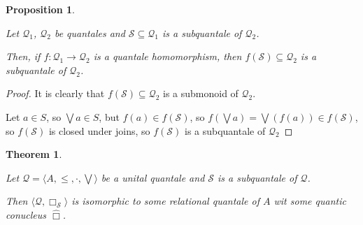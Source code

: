 \documentclass[a4paper]{article}
\theoremstyle{defin}
\theoremstyle{theorem}
\newtheorem{theorem}{Theorem}
\theoremstyle{prop}
\newtheorem{prop}{Proposition}
\theoremstyle{lemma}
\theoremstyle{ex}
\theoremstyle{col}
\begin{document}
\begin{prop}
  $ $

Let $\mathcal{Q}_1$, $\mathcal{Q}_2$ be quantales and
$\mathcal{S} \subseteq \mathcal{Q}_1$ is a subquantale of $\mathcal{Q}_2$.

Then, if $f : \mathcal{Q}_1 \to \mathcal{Q}_2$ is a quantale homomorphism, then $f(\mathcal{S}) \subseteq \mathcal{Q}_2$ is a subquantale of $\mathcal{Q}_2$.
\end{prop}

\begin{proof}
  It is clearly that $f(\mathcal{S}) \subseteq \mathcal{Q}_2$ is a submonoid of $\mathcal{Q}_2$.

  Let $a \in S$, so $\bigvee a \in S$, but $f(a) \in f(\mathcal{S})$, so $f(\bigvee a) = \bigvee (f (a)) \in f(\mathcal{S})$,
  so $f(\mathcal{S})$ is closed under joins, so $f(\mathcal{S})$ is a subquantale of $\mathcal{Q}_2$
\end{proof}

\begin{theorem}
  $ $

  Let $\mathcal{Q} = \langle A, \leq, \cdot, \bigvee \rangle$ be a unital quantale and $\mathcal{S}$ is a subquantale of $\mathcal{Q}$.

  Then $\langle \mathcal{Q}, \Box_{\mathcal{S}} \rangle$ is isomorphic to some relational quantale of $A$
  wit some quantic conucleus $\hat{\Box}$.
\end{theorem}
\end{document}
